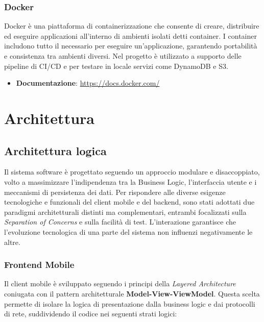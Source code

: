 \documentclass[a4paper,12pt]{article}
\begin{document}
\subsubsection{Docker}
Docker è una piattaforma di containerizzazione che consente di creare, distribuire ed eseguire applicazioni all'interno di ambienti isolati detti container. I container includono tutto il necessario per eseguire un'applicazione, garantendo portabilità e consistenza tra ambienti diversi. Nel progetto è utilizzato a supporto delle pipeline di CI/CD e per testare in locale servizi come DynamoDB e S3.

\begin{itemize}
    \item \textbf{Documentazione}: \url{https://docs.docker.com/}
\end{itemize}

\section{Architettura}
\subsection{Architettura logica} \label{subsec:architettura_logica}

Il sistema software è progettato seguendo un approccio modulare e disaccoppiato, volto a massimizzare l'indipendenza tra la Business Logic, l'interfaccia utente e i meccanismi di persistenza dei dati. Per rispondere alle diverse esigenze tecnologiche e funzionali del client mobile e del backend, sono stati adottati due paradigmi architetturali distinti ma complementari, entrambi focalizzati sulla \textit{Separation of Concerns} e sulla facilità di test.
L'interazione garantisce che l'evoluzione tecnologica di una parte del sistema non influenzi negativamente le altre.

\subsubsection{Frontend Mobile}
Il client mobile è sviluppato seguendo i principi della \textit{Layered Architecture} coniugata con il pattern architetturale \textbf{Model-View-ViewModel}. Questa scelta permette di isolare la logica di presentazione dalla business logic e dai protocolli di rete, suddividendo il codice nei seguenti strati logici:
\end{document}
